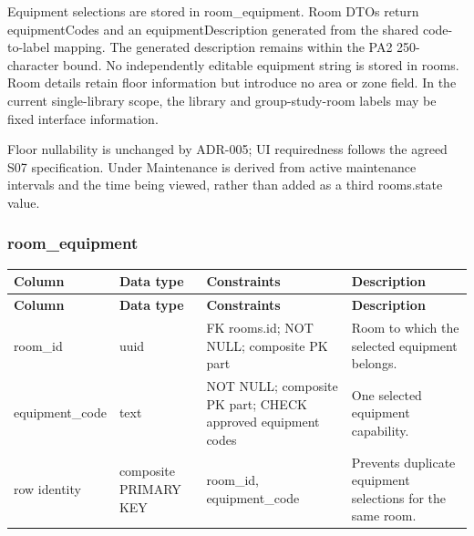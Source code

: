 \vspace{2mm}

Equipment selections are stored in room\allowbreak\_\allowbreak{}equipment. Room DTOs return equipmentCodes and an equipmentDescription generated from the shared code-to-label mapping. The generated description remains within the PA2 250-character bound. No independently editable equipment string is stored in rooms. Room details retain floor information but introduce no area or zone field. In the current single-library scope, the library and group-study-room labels may be fixed interface information.\par

Floor nullability is unchanged by ADR-005; UI requiredness follows the agreed S07 specification. Under Maintenance is derived from active maintenance intervals and the time being viewed, rather than added as a third rooms.state value.\par

\subsubsection{room\allowbreak\_\allowbreak{}equipment}

\begin{longtable}{|p{}|p{}|p{}|p{}|}

\hline

\textbf{Column} & \textbf{Data type} & \textbf{Constraints} & \textbf{Description} \\ \hline

\endfirsthead

\hline

\textbf{Column} & \textbf{Data type} & \textbf{Constraints} & \textbf{Description} \\ \hline

\endhead

room\allowbreak\_\allowbreak{}id & uuid & FK rooms.id; NOT NULL; composite PK part & Room to which the selected equipment belongs. \\ \hline

equipment\allowbreak\_\allowbreak{}code & text & NOT NULL; composite PK part; CHECK approved equipment codes & One selected equipment capability. \\ \hline

row identity & composite PRIMARY KEY & room\allowbreak\_\allowbreak{}id, equipment\allowbreak\_\allowbreak{}code & Prevents duplicate equipment selections for the same room. \\ \hline

\end{longtable}

